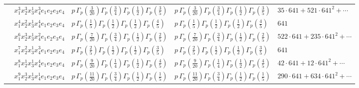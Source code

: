 \documentclass[11pt]{article}
\begin{document}
\begin{table}[ht]
{\begin{tabular}{@{}lllll@{}}
 & $x_{1}^{3} x_{2}^{3} x_{3}^{1} x_{4}^{3}  e_{1} e_{2} e_{3} e_{4}$ & $p \, \Gamma_p \left( \frac{3}{20} \right) \Gamma_p \left( \frac{3}{4} \right) \Gamma_p \left( \frac{1}{2} \right) \Gamma_p \left( \frac{3}{5} \right)$ & $p \, \Gamma_p \left( \frac{3}{20} \right) \Gamma_p \left( \frac{3}{4} \right) \Gamma_p \left( \frac{1}{2} \right) \Gamma_p \left( \frac{3}{5} \right)$ & $35{\cdot}641{+}521{\cdot}641^{2}{+}\cdots$ \\
 & $x_{1}^{4} x_{2}^{2} x_{3}^{1} x_{4}^{4}  e_{1} e_{2} e_{3} e_{4}$ & $p \, \Gamma_p \left( \frac{1}{5} \right) \Gamma_p \left( \frac{1}{2} \right) \Gamma_p \left( \frac{1}{2} \right) \Gamma_p \left( \frac{4}{5} \right)$ & $p \, \Gamma_p \left( \frac{1}{5} \right) \Gamma_p \left( \frac{1}{2} \right) \Gamma_p \left( \frac{1}{2} \right) \Gamma_p \left( \frac{4}{5} \right)$ & $641$ \\
 & $x_{1}^{6} x_{2}^{3} x_{3}^{1} x_{4}^{2}  e_{1} e_{2} e_{3} e_{4}$ & $p \, \Gamma_p \left( \frac{7}{20} \right) \Gamma_p \left( \frac{3}{4} \right) \Gamma_p \left( \frac{1}{2} \right) \Gamma_p \left( \frac{2}{5} \right)$ & $p \, \Gamma_p \left( \frac{7}{20} \right) \Gamma_p \left( \frac{3}{4} \right) \Gamma_p \left( \frac{1}{2} \right) \Gamma_p \left( \frac{2}{5} \right)$ & $522{\cdot}641{+}235{\cdot}641^{2}{+}\cdots$ \\
 & $x_{1}^{7} x_{2}^{2} x_{3}^{1} x_{4}^{3}  e_{1} e_{2} e_{3} e_{4}$ & $p \, \Gamma_p \left( \frac{2}{5} \right) \Gamma_p \left( \frac{1}{2} \right) \Gamma_p \left( \frac{1}{2} \right) \Gamma_p \left( \frac{3}{5} \right)$ & $p \, \Gamma_p \left( \frac{2}{5} \right) \Gamma_p \left( \frac{1}{2} \right) \Gamma_p \left( \frac{1}{2} \right) \Gamma_p \left( \frac{3}{5} \right)$ & $641$ \\
 & $x_{1}^{8} x_{2}^{1} x_{3}^{1} x_{4}^{4}  e_{1} e_{2} e_{3} e_{4}$ & $p \, \Gamma_p \left( \frac{9}{20} \right) \Gamma_p \left( \frac{1}{4} \right) \Gamma_p \left( \frac{1}{2} \right) \Gamma_p \left( \frac{4}{5} \right)$ & $p \, \Gamma_p \left( \frac{9}{20} \right) \Gamma_p \left( \frac{1}{4} \right) \Gamma_p \left( \frac{1}{2} \right) \Gamma_p \left( \frac{4}{5} \right)$ & $42{\cdot}641{+}12{\cdot}641^{2}{+}\cdots$ \\
 & $x_{1}^{9} x_{2}^{3} x_{3}^{1} x_{4}^{1}  e_{1} e_{2} e_{3} e_{4}$ & $p \, \Gamma_p \left( \frac{11}{20} \right) \Gamma_p \left( \frac{3}{4} \right) \Gamma_p \left( \frac{1}{2} \right) \Gamma_p \left( \frac{1}{5} \right)$ & $p \, \Gamma_p \left( \frac{11}{20} \right) \Gamma_p \left( \frac{3}{4} \right) \Gamma_p \left( \frac{1}{2} \right) \Gamma_p \left( \frac{1}{5} \right)$ & $290{\cdot}641{+}634{\cdot}641^{2}{+}\cdots$ \\

\end{tabular}}
\end{table}
\end{document}
